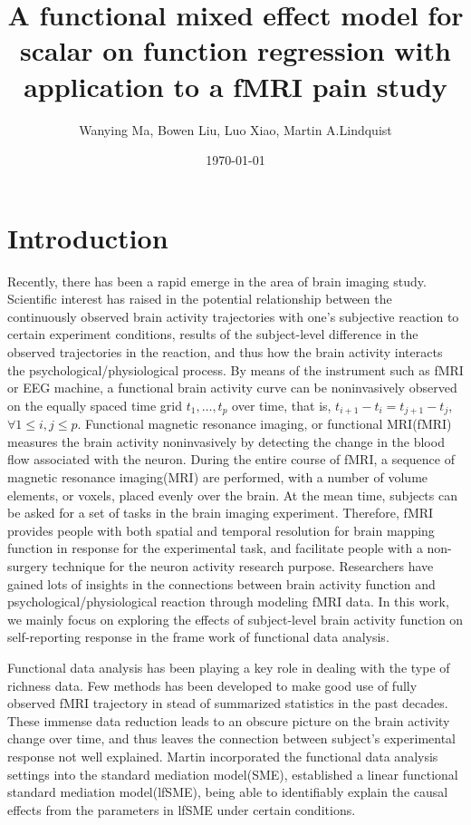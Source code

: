 \documentclass[12pt]{article}
\title{A functional mixed effect model for scalar on function regression with application to a fMRI pain study}
\author{Wanying Ma, Bowen Liu, Luo Xiao, Martin A.Lindquist}
\date{\today}
\begin{document}
\maketitle
\section{Introduction}
Recently, there has been a rapid emerge in the area of brain imaging study\cite{lindquist2008statistical, wager2008prefrontal}. Scientific interest has raised in the potential relationship between the continuously observed brain activity trajectories with one's subjective reaction to certain experiment conditions\cite{lindquist2012functional}, results of the subject-level difference in the observed trajectories in the reaction, and thus how the brain activity interacts the psychological/physiological process. By means of the instrument such as fMRI or EEG machine\cite{wang2016functional}, a functional brain activity curve can be noninvasively observed on the equally spaced time grid $t_1,\dots,t_p$ over time, that is, $t_{i+1}-t_{i}=t_{j+1}-t_j$, $\forall 1\le i,j\le p$. Functional magnetic resonance imaging, or functional MRI(fMRI) measures the brain activity noninvasively by detecting the change in the blood flow associated with the neuron. During the entire course of fMRI, a sequence of magnetic resonance imaging(MRI) are performed, with a number of volume elements, or voxels, placed evenly over the brain\cite{lindquist2008statistical}. At the mean time, subjects can be asked for a set of tasks in the brain imaging experiment. Therefore, fMRI provides people with both spatial and temporal resolution for brain mapping function in response for the experimental task, and facilitate people with a non-surgery technique for the neuron activity research purpose\cite{cohen2017computational}. Researchers have gained lots of insights in the connections between brain activity function and psychological/physiological reaction through modeling fMRI data. In this work, we mainly focus on exploring the effects of subject-level brain activity function on self-reporting response in the frame work of functional data analysis.

Functional data analysis has been playing a key role in dealing with the type of richness data\cite{goldsmith2015generalized,ramsay2006functional,ramsay2007applied,xiao2018fast,xiao2016fast, yao2005functional, mclean2015restricted}. Few methods has been developed to make good use of fully observed fMRI trajectory in stead of summarized statistics in the past decades\cite{cohen2017computational, lindquist2012functional}. These immense data reduction leads to an obscure picture on the brain activity change over time, and thus leaves the connection between subject's experimental response not well explained. Martin\cite{lindquist2012functional} incorporated the functional data analysis settings into the standard mediation model(SME), established a linear functional standard mediation model(lfSME), being able to identifiably explain the causal effects from the parameters in lfSME under certain conditions.
\end{document}
